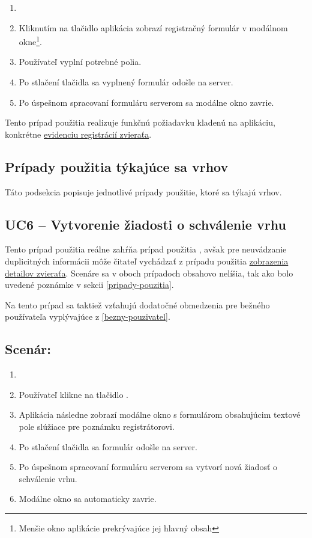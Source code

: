 \begin{enumerate}
	\item {}
	\item Kliknutím na tlačidlo  aplikácia zobrazí registračný formulár v modálnom okne\footnote{Menšie okno aplikácie prekrývajúce jej hlavný obsah}.
	\item Používateľ vyplní potrebné polia.
	\item Po stlačení tlačidla  sa vyplnený formulár odošle na server.
	\item Po úspešnom spracovaní formuláru serverom sa modálne okno zavrie.
\end{enumerate}

Tento prípad použitia realizuje funkčnú požiadavku kladenú na aplikáciu, konkrétne \hyperref[evidencia-registracii-zvierata]{evidenciu registrácií zvieraťa}.

\subsection{Prípady použitia týkajúce sa vrhov}
Táto podsekcia popisuje jednotlivé prípady použitie, ktoré sa týkajú vrhov.

\subsection*{UC6 -- Vytvorenie žiadosti o schválenie vrhu}

Tento prípad použitia reálne zahŕňa prípad použitia , avšak pre neuvádzanie duplicitných informácii môže čitateľ vychádzať z prípadu použitia \hyperref[uc2]{zobrazenia detailov zvieraťa}. Scenáre sa v oboch prípadoch obsahovo nelíšia, tak ako bolo uvedené poznámke v sekcii \ref{pripady-pouzitia}.

Na tento prípad sa taktiež vzťahujú dodatočné obmedzenia pre bežného používateľa vyplývajúce z \ref{bezny-pouzivatel}.

\subsection*{Scenár:}

\begin{enumerate}
	\item {}
	\item Používateľ klikne na tlačidlo .
	\item Aplikácia následne zobrazí modálne okno s formulárom obsahujúcim textové pole slúžiace pre poznámku registrátorovi.
	\item Po stlačení tlačidla  sa formulár odošle na server.
	\item Po úspešnom spracovaní formuláru serverom sa vytvorí nová žiadosť o schválenie vrhu.
	\item Modálne okno sa automaticky zavrie.
\end{enumerate}

